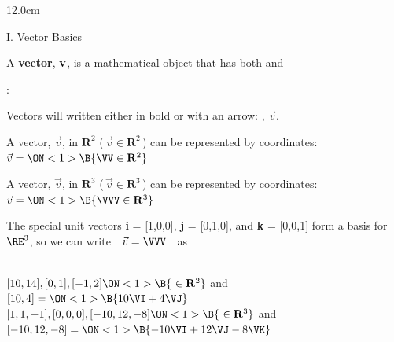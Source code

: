 \begin{frame}
\frametitle{}
\begin{columns}
\begin{column}{12.0cm}

{I. Vector Basics}

\vspace{0.2cm}

\scriptsize

\DEF A {\bf vector}, ${\bf v}$, is a mathematical object that has both  and 

\vspace{0.5cm}

: \\

\vspace{0.2cm}

\OBUL  Vectors will written either in bold or with an arrow: , $\vec{v}$.\\

\vspace{0.2cm}

\OBUL  A vector, $\vec{v}$, in $\mathbf{R}^2$ (\,$\vec{v} \in \mathbf{R}^2$\,) can be represented by  coordinates: \quad $\vec{v} = \ON<1>{\B{\VV \in \mathbf{R}^2}}$\\

\vspace{0.2cm}

\OBUL  A vector, $\vec{v}$, in $\mathbf{R}^3$ (\,$\vec{v} \in \mathbf{R}^3$\,) can be represented by  coordinates: \quad $\vec{v} = \ON<1>{\B{\VVV \in \mathbf{R}^3}}$\\

\vspace{0.2cm}

\OBUL  The special unit vectors {\bf i} = [1,0,0], {\bf j} = [0,1,0], and {\bf k} = [0,0,1] form a basis for $\RE^3$, \NEWLINE so we can write \,\, $\vec{v} = \VVV$ \,\, as \,\, 

\vspace{0.5cm}

\EX \\
\vspace{0.1cm}
\OBUL $[10,14], [0,1], [-1,2] \ON<1>{\B{\,\, \in \mathbf{R}^2}}$ \quad and \quad $[10,4] = \ON<1>{\B{10\VI + 4 \VJ}}$\\
\vspace{0.2cm}
\OBUL $[1,1,-1], [0,0,0], [-10,12,-8] \ON<1>{\B{\,\, \in \mathbf{R}^3}}$ \quad and \quad $[-10,12,-8] = \ON<1>{\B{-10\VI + 12 \VJ - 8\VK}}$\\


\end{column}
\end{columns}
\end{frame}
